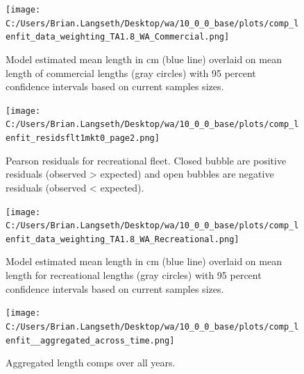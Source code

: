\documentclass[11pt,
  english,
  a4paper,
]{article}
\begin{document}
\begin{figure}
\centering
\texttt{[image: C:/Users/Brian.Langseth/Desktop/wa/10\_0\_0\_base/plots/comp\_lenfit\_data\_weighting\_TA1.8\_WA\_Commercial.png]}
\caption{Model estimated mean length in cm (blue line) overlaid on mean length of commercial lengths (gray circles) with 95 percent confidence intervals based on current samples sizes.\label{fig:com-mean-len-fit}}
\end{figure}

\tagmcend\tagstructend


\begin{figure}
\centering
\texttt{[image: C:/Users/Brian.Langseth/Desktop/wa/10\_0\_0\_base/plots/comp\_lenfit\_residsflt1mkt0\_page2.png]}
\caption{Pearson residuals for recreational fleet. Closed bubble are positive residuals (observed \textgreater{} expected) and open bubbles are negative residuals (observed \textless{} expected).\label{fig:rec-pearson}}
\end{figure}

\tagmcend\tagstructend


\begin{figure}
\centering
\texttt{[image: C:/Users/Brian.Langseth/Desktop/wa/10\_0\_0\_base/plots/comp\_lenfit\_data\_weighting\_TA1.8\_WA\_Recreational.png]}
\caption{Model estimated mean length in cm (blue line) overlaid on mean length for recreational lengths (gray circles) with 95 percent confidence intervals based on current samples sizes.\label{fig:rec-mean-len-fit}}
\end{figure}

\tagmcend\tagstructend


\begin{figure}
\centering
\texttt{[image: C:/Users/Brian.Langseth/Desktop/wa/10\_0\_0\_base/plots/comp\_lenfit\_\_aggregated\_across\_time.png]}
\caption{Aggregated length comps over all years.\label{fig:agg-len-fit}}
\end{figure}
\end{document}
